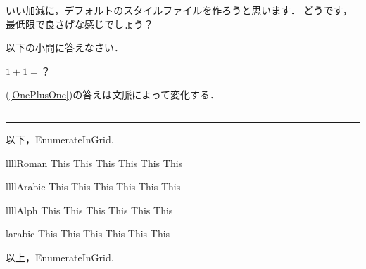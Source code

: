 \documentclass[a4paper]{jlreq}
\begin{document}
いい加減に，デフォルトのスタイルファイルを作ろうと思います．
どうです，最低限で良さげな感じでしょう？

\Q
以下の小問に答えなさい．

\QQ[OnePlusOne]
$1 + 1 =$？

(\ref{OnePlusOne})の答えは文脈によって変化する．

 \rule[-3mm-\fboxsep]{40mm}{10mm}

\rule{40mm}{10mm}


以下，EnumerateInGrid.

\begin{EnumerateInGrid}{llll}{Roman}
  \ItemInGrid This
  \ItemInGrid This
  \ItemInGrid This
  \ItemInGrid This
  \ItemInGrid This
  \ItemInGrid This
\end{EnumerateInGrid}

\begin{EnumerateInGrid}{llll}{Arabic}
  \ItemInGrid This
  \ItemInGrid This
  \ItemInGrid This
  \ItemInGrid This
  \ItemInGrid This
  \ItemInGrid This
\end{EnumerateInGrid}

\begin{EnumerateInGrid}{llll}{Alph}
  \ItemInGrid This
  \ItemInGrid This
  \ItemInGrid This
  \ItemInGrid This
  \ItemInGrid This
  \ItemInGrid This
\end{EnumerateInGrid}

\begin{EnumerateInGrid}{l}{arabic}
  \ItemInGrid This
  \ItemInGrid This
  \ItemInGrid This
  \ItemInGrid This
  \ItemInGrid This
  \ItemInGrid This
\end{EnumerateInGrid}

以上，EnumerateInGrid.
\end{document}
